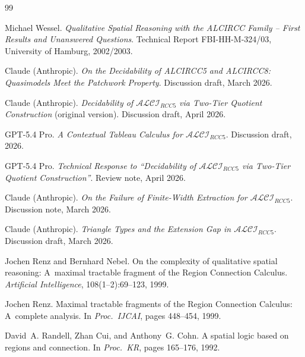 \documentclass[a4paper,11pt]{article}
\theoremstyle{definition}
\begin{document}
\begin{thebibliography}{99}

Michael Wessel.
\newblock \emph{Qualitative Spatial Reasoning with the ALCIRCC Family
  -- First Results and Unanswered Questions}.
\newblock Technical Report FBI-HH-M-324/03, University of Hamburg,
  2002/2003.

Claude (Anthropic).
\newblock \emph{On the Decidability of ALCIRCC5 and ALCIRCC8:
  Quasimodels Meet the Patchwork Property}.
\newblock Discussion draft, March 2026.

Claude (Anthropic).
\newblock \emph{Decidability of $\mathcal{ALCI}_{\mathit{RCC5}}$ via
  Two-Tier Quotient Construction} (original version).
\newblock Discussion draft, April 2026.

GPT-5.4 Pro.
\newblock \emph{A Contextual Tableau Calculus for
  $\mathcal{ALCI}_{\mathit{RCC5}}$}.
\newblock Discussion draft, 2026.

GPT-5.4 Pro.
\newblock \emph{Technical Response to ``Decidability of
  $\mathcal{ALCI}_{\mathit{RCC5}}$ via Two-Tier Quotient
  Construction''}.
\newblock Review note, April 2026.

Claude (Anthropic).
\newblock \emph{On the Failure of Finite-Width Extraction for
  $\mathcal{ALCI}_{\mathit{RCC5}}$}.
\newblock Discussion note, March 2026.

Claude (Anthropic).
\newblock \emph{Triangle Types and the Extension Gap in
  $\mathcal{ALCI}_{\mathit{RCC5}}$}.
\newblock Discussion draft, March 2026.

Jochen Renz and Bernhard Nebel.
\newblock On the complexity of qualitative spatial reasoning:
  A~maximal tractable fragment of the Region Connection Calculus.
\newblock \emph{Artificial Intelligence}, 108(1--2):69--123, 1999.

Jochen Renz.
\newblock Maximal tractable fragments of the Region Connection
  Calculus: A~complete analysis.
\newblock In \emph{Proc.\ IJCAI}, pages 448--454, 1999.

David~A. Randell, Zhan Cui, and Anthony~G. Cohn.
\newblock A spatial logic based on regions and connection.
\newblock In \emph{Proc.\ KR}, pages 165--176, 1992.

\end{thebibliography}
\end{document}
